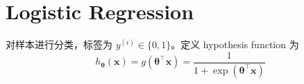 \chapter{Logistic Regression}
	对样本进行分类，标签为 $ y^{(i)} \in \{0, 1\} $。定义 hypothesis function 为
	\begin{equation}
		h_{\bm\theta}(\bm{x}) = g(\bm{\theta}^\intercal \bm{x}) = \frac{1}{1 + \exp{({\bm{\theta}}^\intercal \bm{x})}}
	\end{equation}
	
